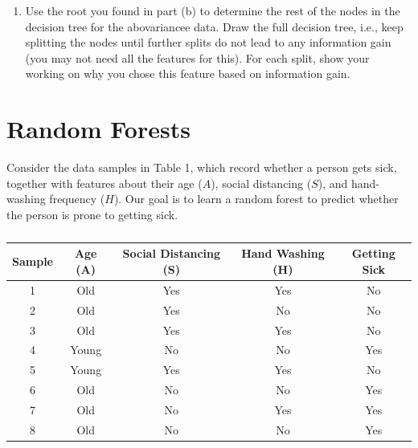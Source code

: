 \documentclass[a3paper,12pt]{extarticle} %
\begin{document}
\begin{enumerate}
    \item  Use the root you found in part (b) to determine the rest of the nodes in the decision tree for the abovariancee data. Draw the full decision tree, i.e., keep splitting the nodes until further splits do not lead to any information gain (you may not need all the features for this). For each split, show your working on why you chose this feature based on information gain.
    \begin{center}
        \end{center}
\end{enumerate}
\newpage
\section{Random Forests}
Consider the data samples in Table 1, which record whether a person gets sick, together with features about their age ($A$), social distancing ($S$), and hand-washing frequency ($H$). Our goal is to learn a random forest to predict whether the person is prone to getting sick.
\begin{table}[h!]
    \centering
    \begin{tabular}{|c|c|c|c|c|}
    \hline
    \textbf{Sample} & \textbf{Age (A)} & \textbf{Social Distancing (S)} & \textbf{Hand Washing (H)} & \textbf{Getting Sick} \\ \hline
    1 & Old & Yes & Yes & No \\ \hline
    2 & Old & Yes & No & No \\ \hline
    3 & Old & Yes & Yes & No \\ \hline
    4 & Young & No & No & Yes \\ \hline
    5 & Young & Yes & Yes & No \\ \hline
    6 & Old & No & No & Yes \\ \hline
    7 & Old & No & Yes & Yes \\ \hline
    8 & Old & No & No & Yes \\ \hline
    \end{tabular}
    \caption{}
    \label{table:data}
    \end{table}
\end{document}
